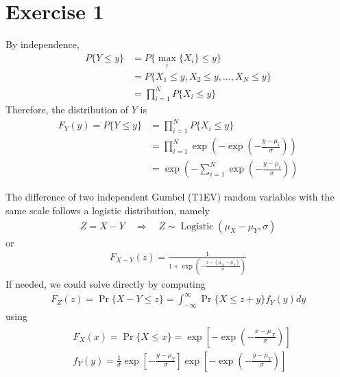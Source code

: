 \section*{Exercise 1}
By independence,
\begin{align*}
    P\{Y\leq y\} &= P\{\max_i\{X_i\}\leq y\} \\
               &= P\{X_1\leq y, X_2\leq y, \ldots, X_N\leq y\} \\
               &= \prod_{i=1}^N P\{X_i\leq y\} 
\end{align*}
Therefore, the distribution of $Y$ is
\begin{align*}
    F_Y(y) = P\{Y\leq y\} &= \prod_{i=1}^N P\{X_i\leq y\} \\
               &= \prod_{i=1}^N \exp\left(-\exp\left(-\frac{y-\mu_i}{\sigma}\right)\right) \\
               &= \exp\left(-\sum_{i=1}^N \exp\left(-\frac{y-\mu_i}{\sigma}\right)\right)
\end{align*}


The difference of two independent Gumbel (T1EV) random variables with the same scale follows a logistic distribution,
namely
\begin{align*}
Z=X-Y \quad \Longrightarrow \quad Z \sim \operatorname{Logistic}\left(\mu_X-\mu_Y, \sigma\right)
\end{align*}
or
\begin{align*}
F_{X-Y}(z)=\frac{1}{1+\exp \left(-\frac{z-\left(\mu_X-\mu_Y\right)}{\sigma}\right)}
\end{align*}
If needed, we could solve directly by computing
\begin{align*}
    F_Z(z)=\operatorname{Pr}\{X-Y \leq z\}=\int_{-\infty}^{\infty} \operatorname{Pr}\{X \leq z+y\} f_Y(y) d y
\end{align*}
using
\begin{align*}
\begin{aligned}
& F_X(x)=\operatorname{Pr}\{X \leq x\}=\exp \left[-\exp \left(-\frac{x-\mu_X}{\sigma}\right)\right] \\
& f_Y(y)=\frac{1}{\sigma} \exp \left[-\frac{y-\mu_Y}{\sigma}\right] \exp \left[-\exp \left(-\frac{y-\mu_Y}{\sigma}\right)\right]
\end{aligned}
\end{align*}


